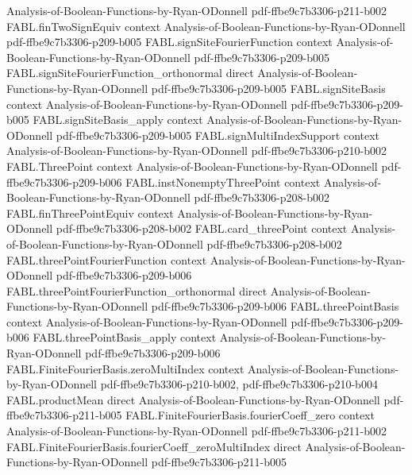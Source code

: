 \begin{theorem}
  {Analysis-of-Boolean-Functions-by-Ryan-ODonnell}
  {pdf-ffbe9c7b3306-p211-b002}
\proofstep
  {FABL.finTwoSignEquiv}
  {context}
  {Analysis-of-Boolean-Functions-by-Ryan-ODonnell}
  {pdf-ffbe9c7b3306-p209-b005}
\proofstep
  {FABL.signSiteFourierFunction}
  {context}
  {Analysis-of-Boolean-Functions-by-Ryan-ODonnell}
  {pdf-ffbe9c7b3306-p209-b005}
\proofstep
  {FABL.signSiteFourierFunction_orthonormal}
  {direct}
  {Analysis-of-Boolean-Functions-by-Ryan-ODonnell}
  {pdf-ffbe9c7b3306-p209-b005}
\proofstep
  {FABL.signSiteBasis}
  {context}
  {Analysis-of-Boolean-Functions-by-Ryan-ODonnell}
  {pdf-ffbe9c7b3306-p209-b005}
\proofstep
  {FABL.signSiteBasis_apply}
  {context}
  {Analysis-of-Boolean-Functions-by-Ryan-ODonnell}
  {pdf-ffbe9c7b3306-p209-b005}
\proofstep
  {FABL.signMultiIndexSupport}
  {context}
  {Analysis-of-Boolean-Functions-by-Ryan-ODonnell}
  {pdf-ffbe9c7b3306-p210-b002}
\proofstep
  {FABL.ThreePoint}
  {context}
  {Analysis-of-Boolean-Functions-by-Ryan-ODonnell}
  {pdf-ffbe9c7b3306-p209-b006}
\proofstep
  {FABL.instNonemptyThreePoint}
  {context}
  {Analysis-of-Boolean-Functions-by-Ryan-ODonnell}
  {pdf-ffbe9c7b3306-p208-b002}
\proofstep
  {FABL.finThreePointEquiv}
  {context}
  {Analysis-of-Boolean-Functions-by-Ryan-ODonnell}
  {pdf-ffbe9c7b3306-p208-b002}
\proofstep
  {FABL.card_threePoint}
  {context}
  {Analysis-of-Boolean-Functions-by-Ryan-ODonnell}
  {pdf-ffbe9c7b3306-p208-b002}
\proofstep
  {FABL.threePointFourierFunction}
  {context}
  {Analysis-of-Boolean-Functions-by-Ryan-ODonnell}
  {pdf-ffbe9c7b3306-p209-b006}
\proofstep
  {FABL.threePointFourierFunction_orthonormal}
  {direct}
  {Analysis-of-Boolean-Functions-by-Ryan-ODonnell}
  {pdf-ffbe9c7b3306-p209-b006}
\proofstep
  {FABL.threePointBasis}
  {context}
  {Analysis-of-Boolean-Functions-by-Ryan-ODonnell}
  {pdf-ffbe9c7b3306-p209-b006}
\proofstep
  {FABL.threePointBasis_apply}
  {context}
  {Analysis-of-Boolean-Functions-by-Ryan-ODonnell}
  {pdf-ffbe9c7b3306-p209-b006}
\proofstep
  {FABL.FiniteFourierBasis.zeroMultiIndex}
  {context}
  {Analysis-of-Boolean-Functions-by-Ryan-ODonnell}
  {pdf-ffbe9c7b3306-p210-b002,
    pdf-ffbe9c7b3306-p210-b004}
\proofstep
  {FABL.productMean}
  {direct}
  {Analysis-of-Boolean-Functions-by-Ryan-ODonnell}
  {pdf-ffbe9c7b3306-p211-b005}
\proofstep
  {FABL.FiniteFourierBasis.fourierCoeff_zero}
  {context}
  {Analysis-of-Boolean-Functions-by-Ryan-ODonnell}
  {pdf-ffbe9c7b3306-p211-b002}
\proofstep
  {FABL.FiniteFourierBasis.fourierCoeff_zeroMultiIndex}
  {direct}
  {Analysis-of-Boolean-Functions-by-Ryan-ODonnell}
  {pdf-ffbe9c7b3306-p211-b005}
\proofstep

\end{theorem}
